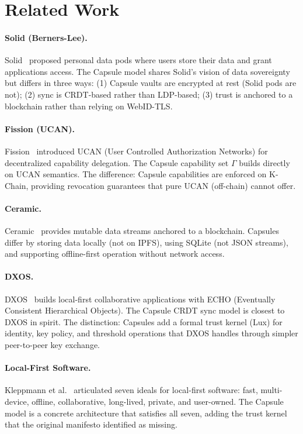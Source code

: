 \section{Related Work}
\label{sec:related}

\paragraph{Solid (Berners-Lee).}
Solid~\cite{solid2016} proposed personal data pods where users store their data
and grant applications access. The Capsule model shares Solid's vision of data
sovereignty but differs in three ways: (1) Capsule vaults are encrypted at rest
(Solid pods are not); (2) sync is CRDT-based rather than LDP-based; (3) trust
is anchored to a blockchain rather than relying on WebID-TLS.

\paragraph{Fission (UCAN).}
Fission~\cite{fission2021} introduced UCAN (User Controlled Authorization
Networks) for decentralized capability delegation. The Capsule capability set
$\Gamma$ builds directly on UCAN semantics. The difference: Capsule capabilities
are enforced on K-Chain, providing revocation guarantees that pure UCAN
(off-chain) cannot offer.

\paragraph{Ceramic.}
Ceramic~\cite{ceramic2020} provides mutable data streams anchored to a
blockchain. Capsules differ by storing data locally (not on IPFS), using
SQLite (not JSON streams), and supporting offline-first operation without
network access.

\paragraph{DXOS.}
DXOS~\cite{dxos2023} builds local-first collaborative applications with ECHO
(Eventually Consistent Hierarchical Objects). The Capsule CRDT sync model is
closest to DXOS in spirit. The distinction: Capsules add a formal trust kernel
(Lux) for identity, key policy, and threshold operations that DXOS handles
through simpler peer-to-peer key exchange.

\paragraph{Local-First Software.}
Kleppmann et al.~\cite{kleppmann2019} articulated seven ideals for local-first
software: fast, multi-device, offline, collaborative, long-lived, private,
and user-owned. The Capsule model is a concrete architecture that satisfies
all seven, adding the trust kernel that the original manifesto identified
as missing.

